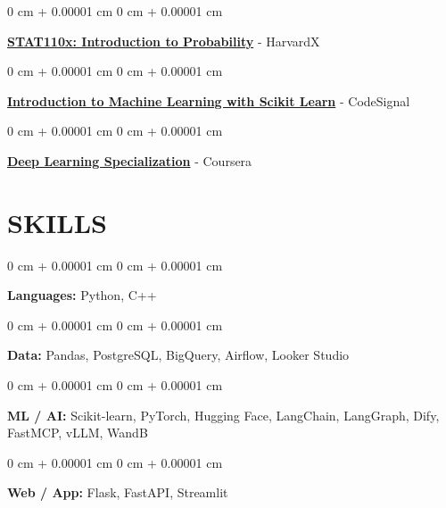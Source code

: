 \documentclass[10pt, letterpaper]{article}
\newenvironment{onecolentry}{
    \begin{adjustwidth}{
        0 cm + 0.00001 cm
    }{
        0 cm + 0.00001 cm
    }
}{
    \end{adjustwidth}
} %
\begin{document}
        \vspace{0.10 cm}
        \begin{onecolentry}
            \href{https://courses.edx.org/certificates/ca67a160161144b7b506766e49c9acbd}{\textbf{STAT110x: Introduction to Probability}} - HarvardX
        \end{onecolentry}

        \vspace{0.10 cm}
        \begin{onecolentry}
            \href{https://codesignal.com/learn/certificates/cm8zkzpup00a1iu0jxois4bml/course-paths/49}{\textbf{Introduction to Machine Learning with Scikit Learn}} - CodeSignal
        \end{onecolentry}
        
        \vspace{0.10 cm}
        \begin{onecolentry}
            \href{https://www.coursera.org/account/accomplishments/specialization/certificate/ZFHHA89GSXHC}{\textbf{Deep Learning Specialization}} - Coursera
        \end{onecolentry}

    \vspace{5 pt - 0.3 cm}
    \section{SKILLS}
        \begin{onecolentry}
            \textbf{Languages:} Python, C++
        \end{onecolentry}

        \vspace{0.10 cm}
        \begin{onecolentry}
            \textbf{Data:} Pandas, PostgreSQL, BigQuery, Airflow, Looker Studio
        \end{onecolentry}

        \vspace{0.10 cm}
        \begin{onecolentry}
            \textbf{ML / AI:} Scikit-learn, PyTorch, Hugging Face, LangChain, LangGraph, Dify, FastMCP, vLLM, WandB
        \end{onecolentry}

        \vspace{0.10 cm}
        \begin{onecolentry}
            \textbf{Web / App:} Flask, FastAPI, Streamlit
        \end{onecolentry}
\end{document}
